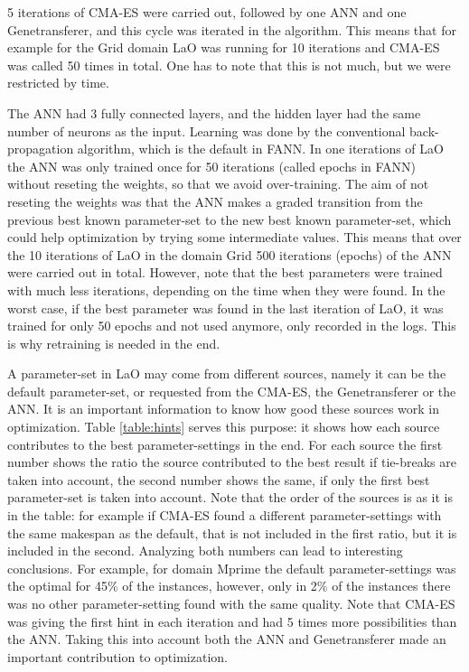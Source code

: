 \documentclass{acm_proc_article-sp}
\begin{document}
5 iterations of CMA-ES were carried out, followed by one ANN and one Genetransferer, and this cycle was iterated in the algorithm. This means that for example for the Grid domain LaO was running for 10 iterations and CMA-ES was called 50 times in total. One has to note that this is not much, but we were restricted by time.

The ANN had 3 fully connected layers, and the hidden layer had the same number of neurons as the input. Learning was done by the conventional back-propagation algorithm, which is the default in FANN. In one iterations of LaO the ANN was only trained once for 50 iterations (called epochs in FANN) without reseting the weights, so that we avoid over-training. The aim of not reseting the weights was that the ANN makes a graded transition from the previous best known parameter-set to the new best known parameter-set, which could help optimization by trying some intermediate values. This means that over the 10 iterations of LaO in the domain Grid 500 iterations (epochs) of the ANN were carried out in total. However, note that the best parameters were trained with much less iterations, depending on the time when they were found. In the worst case, if the best parameter was found in the last iteration of LaO, it was trained for only 50 epochs and not used anymore, only recorded in the logs. This is why retraining is needed in the end.

A parameter-set in LaO may come from different sources, namely it can be the default parameter-set, or requested from the CMA-ES, the Genetransferer or the ANN. It is an important information to know how good these sources work in optimization. Table \ref{table:hints} serves this purpose: it shows how each source contributes to the best parameter-settings in the end. For each source the first number shows the ratio the source contributed to the best result if tie-breaks are taken into account, the second number shows the same, if only the first best parameter-set is taken into account. Note that the order of the sources is as it is in the table: for example if CMA-ES found a different parameter-settings with the same makespan as the default, that is not included in the first ratio, but it is included in the second. Analyzing both numbers can lead to interesting conclusions. For example, for domain Mprime the default parameter-settings was the optimal for 45\% of the instances, however, only in 2\% of the instances there was no other parameter-setting found with the same quality. Note that CMA-ES was giving the first hint in each iteration and had 5 times more possibilities than the ANN. Taking this into account both the ANN and Genetransferer made an important contribution to optimization.
\end{document}
